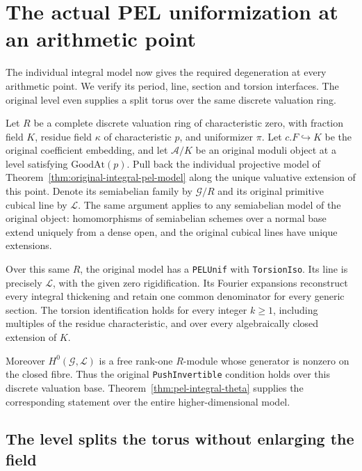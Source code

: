\section{The actual PEL uniformization at an arithmetic point}
\label{sec:dvr-pel-uniformization}

The individual integral model now gives the required degeneration at
every arithmetic point.  We verify its period, line, section and
torsion interfaces.  The original level even supplies a split torus
over the same discrete valuation ring.

Let $R$ be a complete discrete valuation ring of characteristic zero,
with fraction field $K$, residue field $\kappa$ of characteristic $p$,
and uniformizer $\pi$.  Let $c.F\hookrightarrow K$ be the original
coefficient embedding, and let $\mathcal A/K$ be an original moduli
object at a level satisfying $\mathrm{GoodAt}(p)$.
Pull back the individual projective model of
Theorem~\ref{thm:original-integral-pel-model} along the unique
valuative extension of this point.  Denote its semiabelian family by
$\mathcal G/R$ and its original primitive cubical line by $\mathscr L$.
The same argument applies to any semiabelian model of the original
object: homomorphisms of semiabelian schemes over a normal base extend
uniquely from a dense open, and the original cubical lines have unique
extensions\cite[Propositions 3.3.1.5 and 3.3.2.2]{dvr-unif-lan}.

\begin{theorem}
\label{thm:dvr-original-pel-unif}
Over this same $R$, the original model has a
\texttt{PELUnif} with \texttt{TorsionIso}.  Its line is precisely
$\mathscr L$, with the given zero rigidification.  Its Fourier
expansions reconstruct every integral thickening and retain one
common denominator for every generic section.  The torsion
identification holds for every integer $k\geq1$, including multiples
of the residue characteristic, and over every algebraically closed
extension of $K$.

Moreover $H^0(\mathcal G,\mathscr L)$ is a free rank-one $R$-module
whose generator is nonzero on the closed fibre.  Thus the original
\texttt{PushInvertible} condition holds over this discrete valuation
base.  Theorem~\ref{thm:pel-integral-theta} supplies the corresponding
statement over the entire higher-dimensional model.
\end{theorem}

\subsection*{The level splits the torus without enlarging the field}

